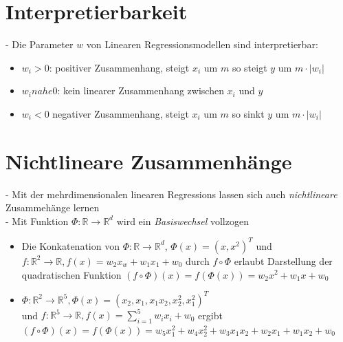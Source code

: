 \documentclass{report}
\begin{document}
\section{Interpretierbarkeit}
- Die Parameter $w$ von Linearen Regressionsmodellen sind interpretierbar:\\
\vspace*{-1.25em}
\begin{itemize}
  \item $w_i > 0$: positiver Zusammenhang, steigt $x_i$ um $m$ so steigt $y$ um $m\cdot |w_i|$
  \item $w_i nahe 0$: kein linearer Zusammenhang zwischen $x_i$ und $y$
  \item $w_i < 0$ negativer Zusammenhang, steigt $x_i$ um $m$ so sinkt $y$ um $m\cdot |w_i|$
\end{itemize}

\section{Nichtlineare Zusammenhänge}
- Mit der mehrdimensionalen linearen Regressions lassen sich auch \textit{nichtlineare} Zusammehänge lernen\\
- Mit Funktion $\Phi: \mathbb{R} \rightarrow \mathbb{R}^d$ wird ein \textit{Basiswechsel} vollzogen\\
\vspace*{-1.25em}
\begin{itemize}
  \item Die Konkatenation von $\Phi: \mathbb{R} \rightarrow \mathbb{R}^d$, $\Phi(x) = (x, x^2)^T$
  und $f: \mathbb{R}^2 \rightarrow \mathbb{R}, f(x) = w_2x_w + w_1x_1 + w_0$ durch $f\circ \Phi$
  erlaubt Darstellung der quadratischen Funktion $(f\circ \Phi)(x) = f(\Phi(x)) = w_2x^2 + w_1x + w_0$
  \item $\Phi: \mathbb{R}^2 \rightarrow \mathbb{R}^5, \Phi(x) = (x_2, x_1, x_1x_2, x_2^2, x_1^2)^T$\\
  und $f: \mathbb{R}^5 \rightarrow \mathbb{R}, f(x) = \sum_{i = 1}^5 w_ix_i + w_0$ ergibt $(f\circ \Phi)(x) = f(\Phi(x)) = w_5x_1^2 + w_4x_2^2 + w_3x_1x_2 + w_2x_1 + w_1x_2 + w_0$
\end{itemize}
\end{document}
